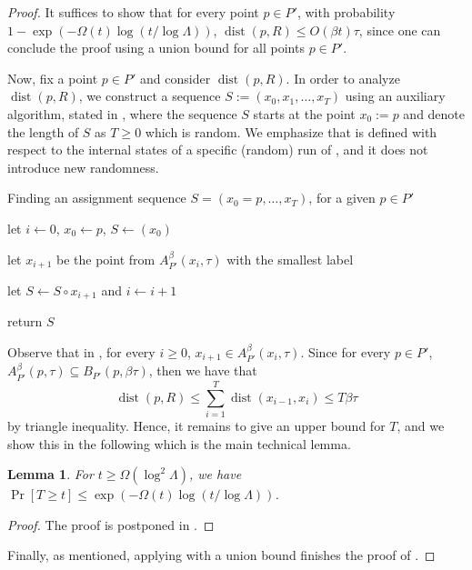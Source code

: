 \documentclass[11pt,letterpaper]{article}
\theoremstyle{plain}
\newtheorem{lemma}[theorem]{Lemma}
\theoremstyle{definition}
\theoremstyle{remark}
\DeclareMathOperator{\dist}{dist}
\begin{document}
\begin{proof}
        It suffices to show that for every point $p\in P'$, with probability $1-\exp(-\Omega(t) \log(t / \log \Lambda))$,
        $\dist(p, R)\leq O(\beta t)\tau$, 
        since one can conclude the proof using a union bound for all points $p\in P'$.
    
        
        Now, fix a point $p\in P'$ and consider $\dist(p, R)$. 
        In order to analyze $\dist(p, R)$, we construct a sequence $S:= (x_{0}, x_{1}, \ldots, x_{T})$ using an auxiliary algorithm, stated in ,
        where the sequence $S$ starts at the point $x_{0}:= p$ and denote the length of $S$ as $T\geq 0$ which is random. 
        We emphasize that  is defined with respect to the internal states of a specific (random) run of ,
        and it does not introduce new randomness.
    \begin{algorithm}[H]
        \caption{Finding an assignment sequence $S=(x_{0}=p, \ldots, x_{T})$, for a given $p\in  P'$}
        \label{alg:find_sequence}
        \begin{algorithmic}[1]


            \State let $i\gets 0$, $x_{0}\gets p$, $S\gets (x_{0})$
            
            \label{line:while}
    
            \State let $x_{i+1}$ be the point from $A_{P'}^{\beta}(x_{i}, \tau)$ with the smallest label 
            \label{line:x_i+1}
    
            \State let $S\gets S \circ x_{i+1}$ and $i\gets i+1$
    
            \EndWhile
            \State return $S$
        \end{algorithmic}
    \end{algorithm}
Observe that in , for every $i\geq 0$, $x_{i+1}\in A_{P'}^{\beta}(x_{i}, \tau)$.  
        Since for every $p\in P'$, $A_{P'}^{\beta}(p, \tau)\subseteq B_{P'}(p, \beta \tau)$, then we have that
        \begin{equation*}
            \dist(p, R)\leq \sum_{i=1}^{T} \dist(x_{i-1}, x_{i}) \leq T\beta \tau
        \end{equation*}
        by triangle inequality.
        Hence, it remains to give an upper bound for $T$, and we show this in the following  which is the main technical lemma.
        \begin{lemma}
            \label{lemma:bound_T}
For $t \geq \Omega(\log^2 \Lambda)$,
            we have $\Pr[T\geq t]\leq \exp(-\Omega(t) \log(t / \log \Lambda))$. 
        \end{lemma} 
        \begin{proof}
            The proof is postponed in .
        \end{proof}
        Finally, as mentioned, applying  with a union bound finishes the proof of .
        \end{proof}
\end{document}
